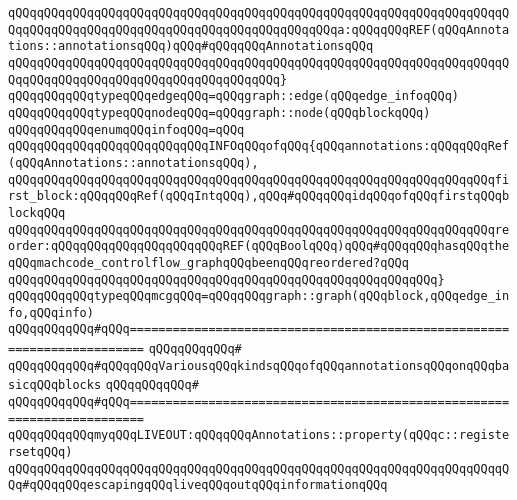 \verb|qQQqqQQqqQQqqQQqqQQqqQQqqQQqqQQqqQQqqQQqqQQqqQQqqQQqqQQqqQQqqQQqqQQqqQQqqQQqqQQqqQQqqQQqqQQqqQQqqQQqqQQqqQQqqQQqqQQqa:qQQqqQQqREF(qQQqAnnotations::annotationsqQQq)qQQq#qQQqqQQqAnnotationsqQQq|\newline
\verb|qQQqqQQqqQQqqQQqqQQqqQQqqQQqqQQqqQQqqQQqqQQqqQQqqQQqqQQqqQQqqQQqqQQqqQQqqQQqqQQqqQQqqQQqqQQqqQQqqQQqqQQqqQQq}|\newline
\newline
\verb|qQQqqQQqqQQqtypeqQQqedgeqQQq=qQQqgraph::edge(qQQqedge_infoqQQq)|\newline
\verb|qQQqqQQqqQQqtypeqQQqnodeqQQq=qQQqgraph::node(qQQqblockqQQq)|\newline
\newline
\verb|qQQqqQQqqQQqenumqQQqinfoqQQq=qQQq|\newline
\verb|qQQqqQQqqQQqqQQqqQQqqQQqqQQqINFOqQQqofqQQq{qQQqannotations:qQQqqQQqRef(qQQqAnnotations::annotationsqQQq),|\newline
\verb|qQQqqQQqqQQqqQQqqQQqqQQqqQQqqQQqqQQqqQQqqQQqqQQqqQQqqQQqqQQqqQQqqQQqfirst_block:qQQqqQQqRef(qQQqIntqQQq),qQQq#qQQqqQQqidqQQqofqQQqfirstqQQqblockqQQq|\newline
\verb|qQQqqQQqqQQqqQQqqQQqqQQqqQQqqQQqqQQqqQQqqQQqqQQqqQQqqQQqqQQqqQQqqQQqreorder:qQQqqQQqqQQqqQQqqQQqqQQqREF(qQQqBoolqQQq)qQQq#qQQqqQQqhasqQQqtheqQQqmachcode_controlflow_graphqQQqbeenqQQqreordered?qQQq|\newline
\verb|qQQqqQQqqQQqqQQqqQQqqQQqqQQqqQQqqQQqqQQqqQQqqQQqqQQqqQQqqQQq}|\newline
\newline
\verb|qQQqqQQqqQQqtypeqQQqmcgqQQq=qQQqqQQqgraph::graph(qQQqblock,qQQqedge_info,qQQqinfo)|\newline
\newline
\verb|qQQqqQQqqQQq#qQQq========================================================================|\newline
\verb|qQQqqQQqqQQq#|\newline
\verb|qQQqqQQqqQQq#qQQqqQQqVariousqQQqkindsqQQqofqQQqannotationsqQQqonqQQqbasicqQQqblocks|\newline
\verb|qQQqqQQqqQQq#|\newline
\verb|qQQqqQQqqQQq#qQQq========================================================================|\newline
\verb|qQQqqQQqqQQqmyqQQqLIVEOUT:qQQqqQQqAnnotations::property(qQQqc::registersetqQQq)|\newline
\verb|qQQqqQQqqQQqqQQqqQQqqQQqqQQqqQQqqQQqqQQqqQQqqQQqqQQqqQQqqQQqqQQqqQQqqQQq#qQQqqQQqescapingqQQqliveqQQqoutqQQqinformationqQQq|\newline
